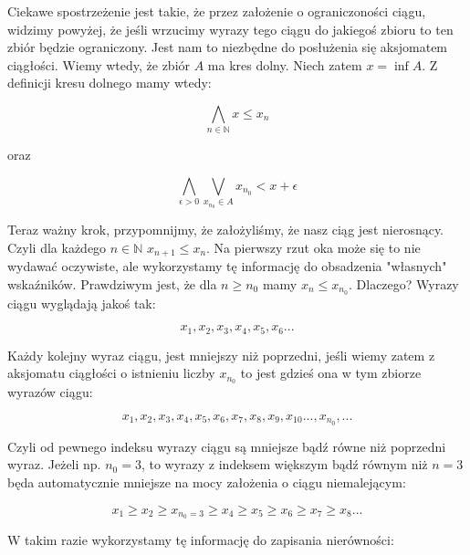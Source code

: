 \documentclass[a4paper,oneside,openright,11pt]{article}
\numberwithin{equation}{section}
\begin{document}
\noindent
Ciekawe spostrzeżenie jest takie, że przez założenie o ograniczoności ciągu, widzimy powyżej, że jeśli wrzucimy wyrazy tego ciągu do jakiegoś zbioru
to ten zbiór będzie ograniczony. Jest nam to niezbędne do posłużenia się aksjomatem ciągłości. Wiemy wtedy, że zbiór $A$ ma kres dolny.
Niech zatem $x = \inf A$. Z definicji kresu dolnego mamy wtedy:


\begin{equation*}
    \bigwedge_{n \in \mathbb{N}} x \leq x_n
\end{equation*}

oraz

\begin{equation*}
    \bigwedge_{\epsilon > 0} \bigvee_{x_{n_0} \in A} x_{n_0} < x + \epsilon
\end{equation*}

\noindent
Teraz ważny krok, przypomnijmy, że założyliśmy, że nasz ciąg jest nierosnący. Czyli dla każdego $n \in \mathbb{N}$ $x_{n + 1} \leq x_n$.
Na pierwszy rzut oka może się to nie wydawać oczywiste, ale wykorzystamy tę informację do obsadzenia "własnych" wskaźników.
Prawdziwym jest, że dla $n \geq n_0$ mamy $x_n \leq x_{n_0}$. Dlaczego? Wyrazy ciągu wyglądają jakoś tak:


\begin{equation*}
    x_{1}, x_{2}, x_{3}, x_{4}, x_{5}, x_{6} ...
\end{equation*}


\noindent
Każdy kolejny wyraz ciągu, jest mniejszy niż poprzedni, jeśli wiemy zatem z aksjomatu ciągłości o istnieniu liczby  $x_{n_0}$ to jest gdzieś ona w tym zbiorze wyrazów ciągu:

\begin{equation*}
    x_{1}, x_{2}, x_{3}, x_{4}, x_{5}, x_{6}, x_{7}, x_{8}, x_{9}, x_{10} ... , x_{n_0}, ...
\end{equation*}

\noindent
Czyli od pewnego indeksu wyrazy ciągu są mniejsze bądź równe niż poprzedni wyraz. Jeżeli np. $n_0 = 3$, to wyrazy z indeksem większym bądź równym niż $n = 3$ będa automatycznie mniejsze
na mocy założenia o ciągu niemalejącym:

\begin{equation*}
    x_{1} \geq x_{2} \geq x_{n_0 = 3} \geq x_{4} \geq x_{5} \geq x_{6} \geq x_{7} \geq x_{8} ...
\end{equation*}

\vspace{10mm}
\noindent
W takim razie wykorzystamy tę informację do zapisania nierówności:
\end{document}
